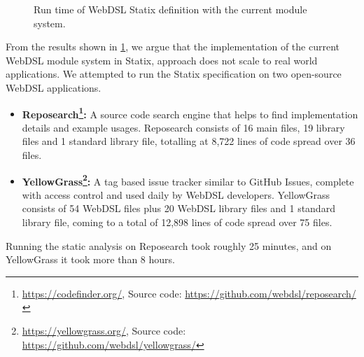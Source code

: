     \begin{figure}
      \parsingbenchmarkresults
      \caption{\label{fig:statix-performance-current-modules}Run time of WebDSL Statix definition with the current module system.}
    \end{figure}

    From the results shown in \cref{fig:statix-performance-current-modules}, we argue that the implementation of the current WebDSL module system in Statix, approach does not scale to real world applications. We attempted to run the Statix specification on two open-source WebDSL applications.

    \begin{itemize}
      \item \textbf{Reposearch\footnote{\url{https://codefinder.org/}, Source code: \url{https://github.com/webdsl/reposearch/}}:} A source code search engine that helps to find implementation details and example usages. Reposearch consists of 16 main files, 19 library files and 1 standard library file, totalling at 8,722 lines of code spread over 36 files.
      \item \textbf{YellowGrass\footnote{\url{https://yellowgrass.org/}, Source code: \url{https://github.com/webdsl/yellowgrass/}}:} A tag based issue tracker similar to GitHub Issues, complete with access control and used daily by WebDSL developers. YellowGrass consists of 54 WebDSL files plus 20 WebDSL library files and 1 standard library file, coming to a total of 12,898 lines of code spread over 75 files.
    \end{itemize}

    Running the static analysis on Reposearch took roughly 25 minutes, and on YellowGrass it took more than 8 hours.

